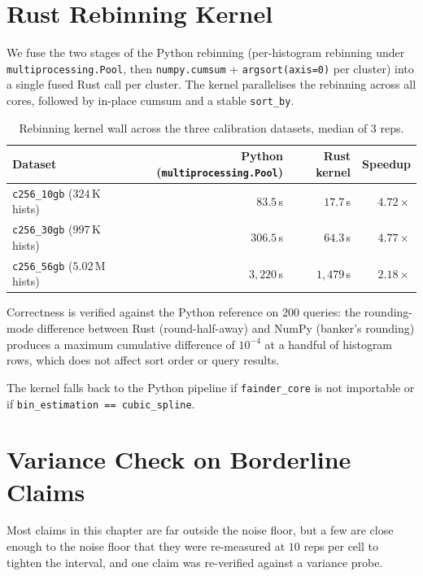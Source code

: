 \section{Rust Rebinning Kernel\label{sec:exp:rebinning}}

We fuse the two stages of the Python rebinning (per-histogram rebinning under \texttt{multiprocessing.Pool}, then \texttt{numpy.cumsum} + \texttt{argsort(axis=0)} per cluster) into a single fused Rust call per cluster. The kernel parallelises the rebinning across all cores, followed by in-place cumsum and a stable \texttt{sort\_by}.

\begin{table}[H]
  \centering
  \caption[Rebinning kernel wall times.]{Rebinning kernel wall across the three calibration datasets, median of 3 reps.}
  \label{tab:rebin}
  \footnotesize
  \begin{tabular}{lrrr}
    \toprule
    Dataset & Python (\texttt{multiprocessing.Pool}) & Rust kernel & Speedup \\
    \midrule
    \texttt{c256\_10gb} ($324$\,K hists) & $83.5$\,s & $17.7$\,s & $4.72\times$ \\
    \texttt{c256\_30gb} ($997$\,K hists) & $306.5$\,s & $64.3$\,s & $4.77\times$ \\
    \texttt{c256\_56gb} ($5.02$\,M hists) & $3{,}220$\,s & $1{,}479$\,s & $2.18\times$ \\
    \bottomrule
  \end{tabular}
\end{table}

Correctness is verified against the Python reference on $200$ queries: the rounding-mode difference between Rust (round-half-away) and NumPy (banker's rounding) produces a maximum cumulative difference of $10^{-4}$ at a handful of histogram rows, which does not affect sort order or query results.

The kernel falls back to the Python pipeline if \texttt{fainder\_core} is not importable or if \texttt{bin\_estimation == \textquotesingle cubic\_spline\textquotesingle}.

\section{Variance Check on Borderline Claims\label{sec:exp:variance}}

Most claims in this chapter are far outside the noise floor, but a few are close enough to the noise floor that they were re-measured at $10$ reps per cell to tighten the interval, and one claim was re-verified against a variance probe.

